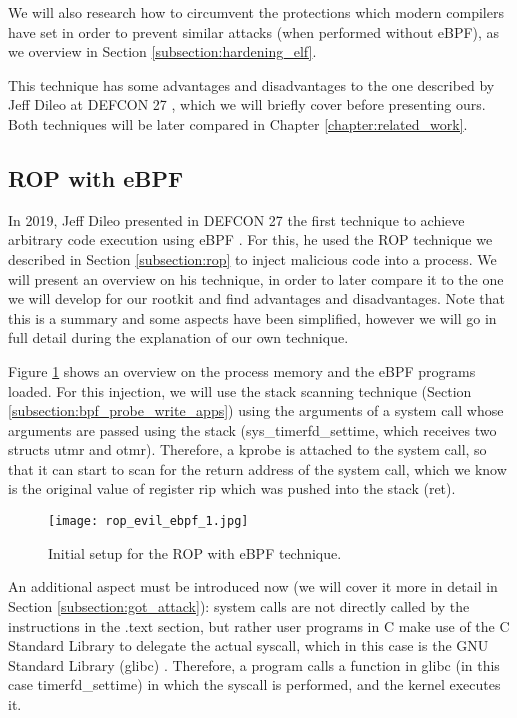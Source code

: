 We will also research how to circumvent the protections which modern compilers have set in order to prevent similar attacks (when performed without eBPF), as we overview in Section \ref{subsection:hardening_elf}.

This technique has some advantages and disadvantages to the one described by Jeff Dileo at DEFCON 27 \cite{evil_ebpf_p6974}, which we will briefly cover before presenting ours. Both techniques will be later compared in Chapter \ref{chapter:related_work}.


\subsection{ROP with eBPF} \label{subsection:rop_ebpf}
In 2019, Jeff Dileo presented in DEFCON 27 the first technique to achieve arbitrary code execution using eBPF \cite{evil_ebpf_p6974}. For this, he used the ROP technique we described in Section \ref{subsection:rop} to inject malicious code into a process. We will present an overview on his technique, in order to later compare it to the one we will develop for our rootkit and find advantages and disadvantages. Note that this is a summary and some aspects have been simplified, however we will go in full detail during the explanation of our own technique.

Figure \ref{fig:rop_evil_ebpf_1} shows an overview on the process memory and the eBPF programs loaded. For this injection, we will use the stack scanning technique (Section \ref{subsection:bpf_probe_write_apps}) using the arguments of a system call whose arguments are passed using the stack (sys\_timerfd\_settime, which receives two structs utmr and otmr). Therefore, a kprobe is attached to the system call, so that it can start to scan for the return address of the system call, which we know is the original value of register rip which was pushed into the stack (ret).

\begin{figure}[htbp]
	\centering
	\texttt{[image: rop\_evil\_ebpf\_1.jpg]}
	\caption{Initial setup for the ROP with eBPF technique.}
	\label{fig:rop_evil_ebpf_1}
\end{figure}

An additional aspect must be introduced now (we will cover it more in detail in Section \ref{subsection:got_attack}): system calls are not directly called by the instructions in the .text section, but rather user programs in C make use of the C Standard Library to delegate the actual syscall, which in this case is the GNU Standard Library (glibc) \cite{glibc}. Therefore, a program calls a function in glibc (in this case timerfd\_settime) in which the syscall is performed, and the kernel executes it.


